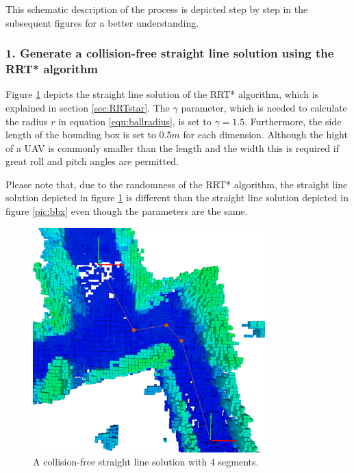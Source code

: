 This schematic description of the process is depicted step by step in the subsequent figures for a better understanding.

\subsubsection{1. Generate a collision-free straight line solution using the RRT* algorithm}

Figure \ref{pic:RRTstepOne} depicts the straight line solution of the RRT* algorithm, which is explained in section \ref{sec:RRTstar}.  The $\gamma$ parameter, which is needed to calculate the radius $r$ in equation \ref{equ:ballradius}, is set to $\gamma = 1.5$. Furthermore, the side length of the bounding box is set to $0.5m$ for each dimension. Although the hight of a UAV is commonly smaller than the length and the width this is required if great roll and pitch angles are permitted. \newline


Please note that, due to the randomness of the RRT* algorithm, the straight line solution depicted in figure  \ref{pic:RRTstepOne} is different than the straight line solution depicted in figure \ref{pic:bbx} even though the parameters are the same. 

\begin{figure}[h]
   \centering
   \includegraphics[trim = 45mm 0mm 35mm 0mm,clip,width=0.8\textwidth]{pics/extensionLongP.png}
   \caption{A collision-free straight line solution with 4 segments.}
   \label{pic:RRTstepOne}
\end{figure}



